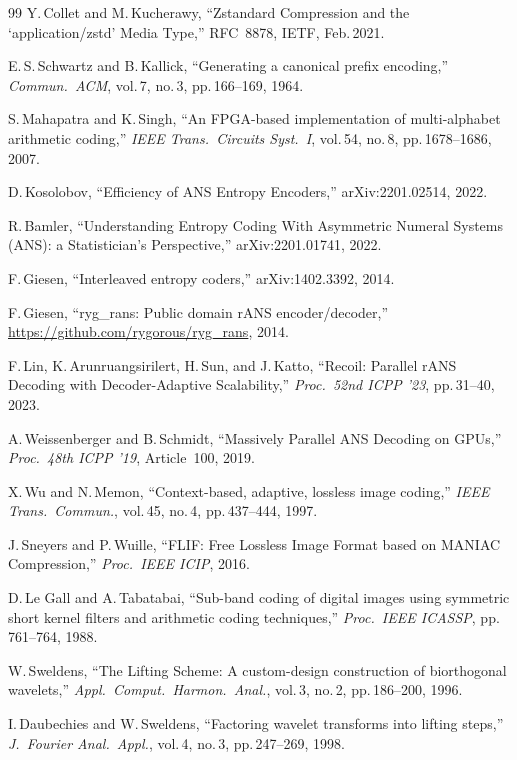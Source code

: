 \documentclass[journal]{IEEEtran}
\begin{document}
\begin{thebibliography}{99}
Y.\,Collet and M.\,Kucherawy,
``Zstandard Compression and the `application/zstd' Media Type,''
RFC~8878, IETF, Feb.\,2021.

E.\,S.\,Schwartz and B.\,Kallick,
``Generating a canonical prefix encoding,''
\textit{Commun.\ ACM}, vol.\,7, no.\,3, pp.\,166--169, 1964.

S.\,Mahapatra and K.\,Singh,
``An FPGA-based implementation of multi-alphabet arithmetic coding,''
\textit{IEEE Trans.\ Circuits Syst.\ I}, vol.\,54, no.\,8, pp.\,1678--1686,
2007.

D.\,Kosolobov, ``Efficiency of ANS Entropy Encoders,''
arXiv:2201.02514, 2022.

R.\,Bamler, ``Understanding Entropy Coding With Asymmetric Numeral Systems
(ANS): a Statistician's Perspective,'' arXiv:2201.01741, 2022.

F.\,Giesen, ``Interleaved entropy coders,'' arXiv:1402.3392, 2014.

F.\,Giesen, ``ryg\_rans: Public domain rANS encoder/decoder,''
\url{https://github.com/rygorous/ryg_rans}, 2014.

F.\,Lin, K.\,Arunruangsirilert, H.\,Sun, and J.\,Katto,
``Recoil: Parallel rANS Decoding with Decoder-Adaptive Scalability,''
\textit{Proc.\ 52nd ICPP '23}, pp.\,31--40, 2023.

A.\,Weissenberger and B.\,Schmidt,
``Massively Parallel ANS Decoding on GPUs,''
\textit{Proc.\ 48th ICPP '19}, Article~100, 2019.

X.\,Wu and N.\,Memon,
``Context-based, adaptive, lossless image coding,''
\textit{IEEE Trans.\ Commun.}, vol.\,45, no.\,4, pp.\,437--444, 1997.

J.\,Sneyers and P.\,Wuille,
``FLIF: Free Lossless Image Format based on MANIAC Compression,''
\textit{Proc.\ IEEE ICIP}, 2016.

D.\,Le Gall and A.\,Tabatabai,
``Sub-band coding of digital images using symmetric short kernel filters and
arithmetic coding techniques,'' \textit{Proc.\ IEEE ICASSP}, pp.\,761--764,
1988.

W.\,Sweldens,
``The Lifting Scheme: A custom-design construction of biorthogonal wavelets,''
\textit{Appl.\ Comput.\ Harmon.\ Anal.}, vol.\,3, no.\,2, pp.\,186--200, 1996.

I.\,Daubechies and W.\,Sweldens,
``Factoring wavelet transforms into lifting steps,''
\textit{J.\ Fourier Anal.\ Appl.}, vol.\,4, no.\,3, pp.\,247--269, 1998.


\end{thebibliography}
\end{document}
